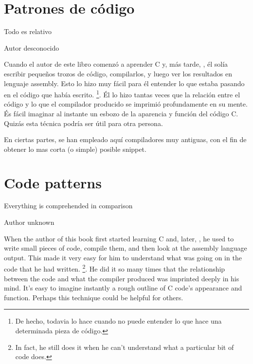 \ifdefined\SPANISH
\part{Patrones de código}

\epigraph{Todo es relativo}{Autor desconocido}

Cuando el autor de este libro comenzó a aprender C y, más tarde, \Cpp, él solía escribir pequeños trozos de código, compilarlos, 
y luego ver los resultados en lenguaje assembly. Esto lo hizo muy fácil para él entender lo que estaba pasando en el código que había escrito.
\footnote{De hecho, todavia lo hace cuando no puede entender lo que hace una determinada pieza de código.}. 
Él lo hizo tantas veces que la relación entre el código \CCpp y lo que el compilador producido se imprimió profundamente en su mente. 
És fácil imaginar al instante un esbozo de la aparencia y función del código C. 
Quizás esta técnica podría ser útil para otra persona.


En ciertas partes, se han empleado aquí compiladores muy antiguas, con el fin de obtener lo mas corta (o simple) posible snippet.
\fi %

\ifdefined\ENGLISH
\part{Code patterns}

\epigraph{Everything is comprehended in comparison}{Author unknown}

When the author of this book first started learning C and, later, \Cpp, he used to write small pieces of code, compile them, 
and then look at the assembly language output. This made it very easy for him to understand what was going on in the code that he had written.
\footnote{In fact, he still does it when he can't understand what a particular bit of code does.}. 
He did it so many times that the relationship between the \CCpp code and what the compiler produced was imprinted deeply in his mind. 
It's easy to imagine instantly a rough outline of C code's appearance and function. 
Perhaps this technique could be helpful for others.

